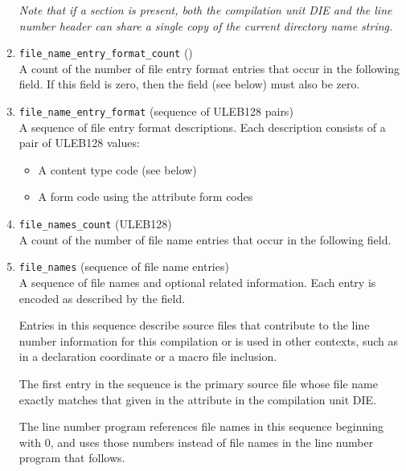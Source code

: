 \begin{enumerate}[1. ]
\textit{Note that if a \dotdebuglinestr{} section is present, 
both the compilation unit DIE and the line number header can
share a single copy of the current directory name string.}

\item \texttt{file\_name\_entry\_format\_count} (\HFTubyte) \\
A count of the number of file entry format entries that
occur in the following  field. 
If this field is zero, then the  field 
(see below) must also be zero.

\item \texttt{file\_name\_entry\_format} (sequence of ULEB128 pairs) \\
A sequence of file entry format descriptions.
Each description consists of a pair of ULEB128 values:
\begin{itemize}
\setlength{\itemsep}{0em}
\item A content type code (see below)
\item A form code using the attribute form codes
\end{itemize}

\item \texttt{file\_names\_count} (ULEB128) \\
A count of the number of file name entries that occur
in the following  field.

\item \texttt{file\_names} (sequence of file name entries) \\
A sequence of file names and optional related
information. Each entry is encoded as described
by the  field.
  
Entries in this sequence describe source files that
contribute to the line number information for this
compilation or is used in other contexts, such as in
a declaration coordinate or a macro file inclusion.
 
The first entry in the sequence is the primary source file 
whose file name exactly matches that given in the 
\DWATname{} attribute in the compilation unit DIE.
   
The line number program references file names in this 
sequence beginning with 0, and uses those numbers instead 
of file names in the line number program that follows.


\end{enumerate}
